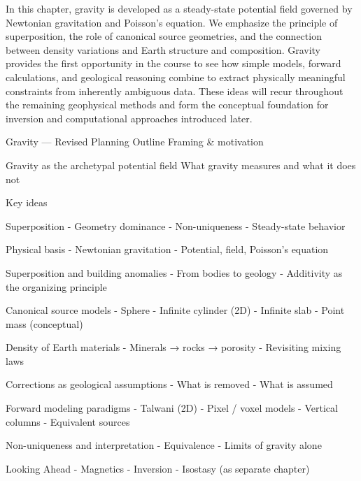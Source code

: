 In this chapter, gravity is developed as a steady-state potential field governed by Newtonian gravitation and Poisson's equation. We emphasize the principle of superposition, the role of canonical source geometries, and the connection between density variations and Earth structure and composition. Gravity provides the first opportunity in the course to see how simple models, forward calculations, and geological reasoning combine to extract physically meaningful constraints from inherently ambiguous data. These ideas will recur throughout the remaining geophysical methods and form the conceptual foundation for inversion and computational approaches introduced later.

Gravity — Revised Planning Outline
Framing \& motivation

Gravity as the archetypal potential field
What gravity measures and what it does not

Key ideas

Superposition
- Geometry dominance
- Non-uniqueness
- Steady-state behavior

Physical basis
- Newtonian gravitation
- Potential, field, Poisson's equation

Superposition and building anomalies
- From bodies to geology
- Additivity as the organizing principle

Canonical source models
- Sphere
- Infinite cylinder (2D)
- Infinite slab
- Point mass (conceptual)

Density of Earth materials
- Minerals → rocks → porosity
- Revisiting mixing laws

Corrections as geological assumptions
- What is removed
- What is assumed

Forward modeling paradigms
- Talwani (2D)
- Pixel / voxel models
- Vertical columns
- Equivalent sources

Non-uniqueness and interpretation
- Equivalence
- Limits of gravity alone

Looking Ahead
- Magnetics
- Inversion
- Isostasy (as separate chapter)

